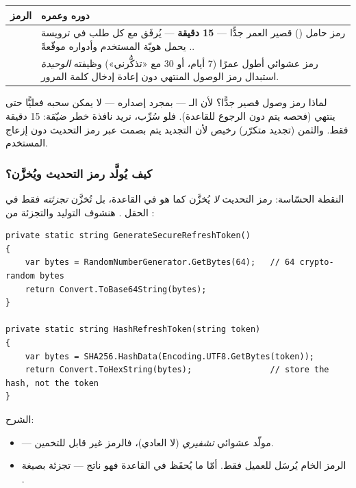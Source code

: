 \begin{center}
\begin{tabular}{L{3.2cm} L{11.4cm}}
\toprule
\textbf{\color{spPrimary}الرمز} & \textbf{\color{spPrimary}دوره وعمره} \\
\midrule
{} & رمز حامل () قصير العمر جدًّا — \textbf{15 دقيقة} —
يُرفَق مع كل طلب في ترويسة . يحمل هويّة المستخدم وأدواره موقّعةً. \\
 & رمز عشوائي أطول عمرًا (7 أيام، أو 30 مع «تذكُّرني») وظيفته
\emph{الوحيدة} استبدال رمز الوصول المنتهي دون إعادة إدخال كلمة المرور. \\
\bottomrule
\end{tabular}
\end{center}

\begin{why}
لماذا رمز وصول قصير جدًّا؟ لأن الـ — بمجرد إصداره — لا يمكن سحبه فعليًّا حتى
ينتهي (فحصه يتم دون الرجوع للقاعدة). فلو سُرِّب، نريد نافذة خطر ضيّقة: 15 دقيقة فقط.
والثمن (تجديد متكرّر) رخيص لأن التجديد يتم بصمت عبر رمز التحديث دون إزعاج المستخدم.
\end{why}

\subsubsection{كيف يُولَّد رمز التحديث ويُخزَّن؟}
النقطة الحسّاسة: رمز التحديث \emph{لا} يُخزَّن كما هو في القاعدة، بل تُخزَّن
\emph{تجزئته} فقط في الحقل . هنشوف التوليد والتجزئة من
:

\begin{english}
\begin{lstlisting}[language={[Sharp]C}]
private static string GenerateSecureRefreshToken()
{
    var bytes = RandomNumberGenerator.GetBytes(64);   // 64 crypto-random bytes
    return Convert.ToBase64String(bytes);
}

private static string HashRefreshToken(string token)
{
    var bytes = SHA256.HashData(Encoding.UTF8.GetBytes(token));
    return Convert.ToHexString(bytes);                // store the hash, not the token
}
\end{lstlisting}
\end{english}

الشرح:
\begin{itemize}
\item {} — مولّد عشوائي \emph{تشفيري} (لا
   العادي)، فالرمز غير قابل للتخمين.
\item الرمز الخام يُرسَل للعميل فقط. أمّا ما يُحفَظ في القاعدة فهو ناتج
   — تجزئة  بصيغة .
\end{itemize}

